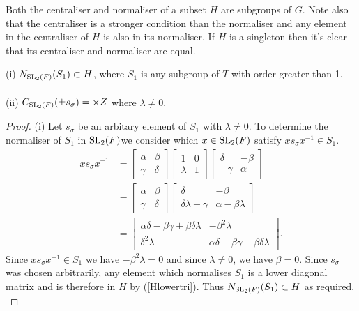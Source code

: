 Both the centraliser and normaliser of a subset $H$ are subgroups of $G$. Note also that the centraliser is a stronger condition than the normaliser and any element in the centraliser of $H$ is also in its normaliser. If $H$ is a singleton then it's clear that its centraliser and normaliser are equal.\\

\begin{proposition}
    \label{6.4i}
(i) $N_{\operatorname{SL}_2(F)}(S_1) \subset H$, where $S_1$ is any subgroup of $T$ with order greater than 1. \\
\\
(ii) $C_{\operatorname{SL}_2(F)}(\pm s_\sigma) = \times Z$ where $\lambda \neq 0$.
\end{proposition}

\begin{proof}
(i) Let $s_\sigma$ be an arbitary element of $S_1$ with $\lambda \neq 0$. To determine the normaliser of $S_1$ in $\operatorname{SL}_2(F)$we consider which $x \in \operatorname{SL}_2(F)$ satisfy $x s_\sigma x^{-1} \in S_1$.
\begin{align*} x s_\sigma x^{-1} &= \begin{bmatrix} \alpha & \beta \\ \gamma & \delta \end{bmatrix} \begin{bmatrix} 1 & 0 \\ \lambda & 1 \end{bmatrix} \begin{bmatrix} \delta & \minus \beta \\ \minus \gamma & \alpha \end{bmatrix}
\\[1.5ex] &= \begin{bmatrix} \alpha & \beta \\ \gamma & \delta \end{bmatrix} \begin{bmatrix} \delta & \minus \beta \\ \delta \lambda - \gamma & \alpha - \beta \lambda \end{bmatrix}
\\[1.5ex] &= \begin{bmatrix} \alpha \delta - \beta \gamma + \beta \delta \lambda & \minus \beta^2  \lambda \\ \delta^2 \lambda & \alpha \delta - \beta \gamma - \beta \delta \lambda \end{bmatrix}.
\end{align*}
Since $x s_\sigma x^{-1} \in S_1$ we have $\minus \beta^2  \lambda = 0$ and since $\lambda \neq 0$, we have $\beta = 0$. Since $s_\sigma$ was chosen arbitrarily, any element which normalises $S_1$ is a lower diagonal matrix and is therefore in $H$ by (\ref{Hlowertri}). Thus $N_{\operatorname{SL}_2(F)}(S_1) \subset H$ as required. \\

\end{proof}
